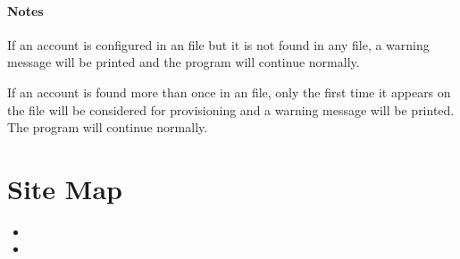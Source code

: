 \documentclass[letterpaper,10pt,english]{sphinxmanual}
\begin{document}
\begin{fulllineitems}
\begin{quote}
\begin{description}
\begin{description}
\end{description}

\end{description}\end{quote}




{\hyperref[\detokenize{grafanaAPI:grafanaAPI.setUserRoleOrg}]{}}


\subsubsection*{Notes}

If an account is configured in an  file but it is not found in any
 file, a warning message will be printed and the program will
continue normally.

If an account is found more than once in an  file, only the first
time it appears on the file will be considered for provisioning and a warning
message will be printed. The program will continue normally.

\end{fulllineitems}



\chapter{Site Map}
\label{\detokenize{index:site-map}}\begin{itemize}
\item {} 

\item {} 

\end{itemize}


\renewcommand{\indexname}{Python Module Index}
\begin{sphinxtheindex}
\let\bigletter\sphinxstyleindexlettergroup
\bigletter{g}
\item\relax{}
\item\relax{}
\item\relax{}
\item\relax{}
\indexspace
\bigletter{y}
\item\relax{}
\end{sphinxtheindex}

\renewcommand{\indexname}{Index}
\printindex
\end{document}
